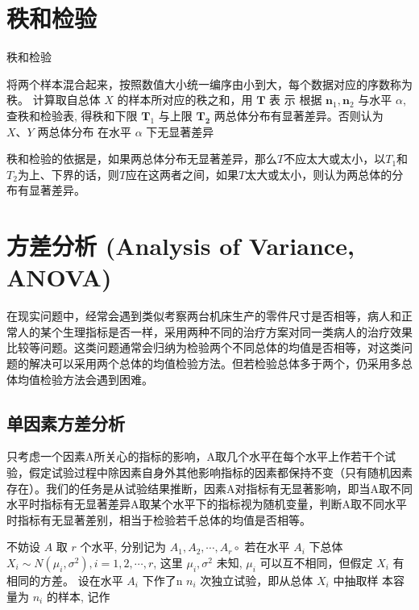 \section{秩和检验}

\begin{algorithm}\caption{秩和检验}
将两个样本混合起来，按照数值大小统一编序由小到大，每个数据对应的序数称为秩。\;
计算取自总体 \( X \) 的样本所对应的秩之和，用 \( \boldsymbol{T} \) 表 示\;
根据 \( \boldsymbol{n}_{1}, \boldsymbol{n}_{2} \) 与水平 \( \alpha \), 查秩和检验表, 得秩和下限 \( \boldsymbol{T}_{1} \) 与上限 \( \boldsymbol{T}_{\mathbf{2}} \) \;
两总体分布有显著差异。否则认为 \( X 、 Y \) 两总体分布
在水平 \( \alpha \) 下无显著差异\;
\end{algorithm}

秩和检验的依据是，如果两总体分布无显著差异，那么$T$不应太大或太小，以$T_1$和$T_2$为上、下界的话，则$T$应在这两者之间，如果$T$太大或太小，则认为两总体的分布有显著差异。

\section{方差分析 (Analysis of Variance, ANOVA)}

在现实问题中，经常会遇到类似考察两台机床生产的零件尺寸是否相等，病人和正常人的某个生理指标是否一样，采用两种不同的治疗方案对同一类病人的治疗效果比较等问题。这类问题通常会归纳为检验两个不同总体的均值是否相等，对这类问题的解决可以采用两个总体的均值检验方法。但若检验总体多于两个，仍采用多总体均值检验方法会遇到困难。

\subsection{单因素方差分析}

只考虑一个因素A所关心的指标的影响，A取几个水平在每个水平上作若干个试验，假定试验过程中除因素自身外其他影响指标的因素都保持不变（只有随机因素存在）。我们的任务是从试验结果推断，因素A对指标有无显著影响，即当A取不同水平时指标有无显著差异A取某个水平下的指标视为随机变量，判断A取不同水平时指标有无显著差别，相当于检验若千总体的均值是否相等。

不妨设 $A$ 取 $r$ 个水平, 分别记为 $A_{1}, A_{2}, \cdots, A_{r} \circ$ 若在水平 $A_{i}$ 下总体 $X_{i} \sim N\left(\mu_{i}, \sigma^{2}\right), i=1,2, \cdots, r$, 这里 $\mu_{i}, \sigma^{2}$ 未知, $\mu_{i}$ 可以互不相同，但假定 $X_{i}$ 有相同的方差。 设在水平 $A_{i}$ 下作了n $n_{i}$ 次独立试验，即从总体 $X_{i}$ 中抽取样 本容量为 $n_{i}$ 的样本, 记作

